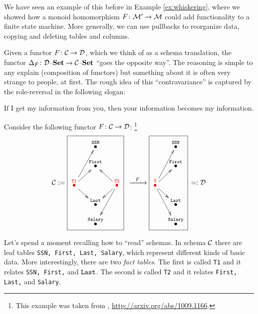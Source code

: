 \documentclass[CT4S-EN-RU]{subfiles}
\begin{document}
We have seen an example of this before in Example \ref{ex:whiskering}, where we showed how a monoid homomorphism $F\colon\mathcal{M}'\rightarrow\mathcal{M}$ could add functionality to a finite state machine. More generally, we can use pullbacks to reorganize data, copying and deleting tables and columns. 

\begin{remark}

Given a functor $F\colon\mathcal{C}\rightarrow\mathcal{D}$, which we think of as a schema translation, the functor $\Delta_F\colon\mathcal{D}{\text \textendash}{\bf Set}\rightarrow\mathcal{C}{\text \textendash}{\bf Set}$ “goes the opposite way”. The reasoning is simple to any explain (composition of functors) but something about it is often very strange to people, at first. The rough idea of this “contravariance” is captured by the role-reversal in the following slogan:

\begin{slogan} 
If I get my information from you, then your information becomes my information. 
\end{slogan}

\end{remark}

Consider the following functor $F\colon\mathcal{C}\rightarrow\mathcal{D}$: 
\footnote{This example was taken from \cite{Sp1}, \url{http://arxiv.org/abs/1009.1166}.}
\begin{align}\label{dia:translation}
\mcC:=\parbox{1.2in}{\fbox{\xymatrix@=10pt{&\LTO{SSN}\\&\LTO{First}\\\color{red}{\LTO{T1}}\ar[uur]\ar[ur]\ar[dr]&&\color{red}{\LTO{T2}}\ar[ul]\ar[dl]\ar[ddl]\\&\LTO{Last}\\&\LTO{Salary}}}}\Too{F}\parbox{.8in}{\fbox{\xymatrix@=10pt{&\LTO{SSN}\\&\LTO{First}\\\color{red}{\LTO{T}}\ar[uur]\ar[ur]\ar[dr]\ar[ddr]\\&\LTO{Last}\\&\LTO{Salary}}}}=:\mcD
\end{align}

Let's spend a moment recalling how to “read” schemas. In schema $\mathcal{C}$ there are leaf tables {\tt SSN, First, Last, Salary}, which represent different kinds of basic data. More interestingly, there are two {\em fact tables}. The first is called {\tt T1} and it relates {\tt SSN, First,} and ${\tt Last}$. The second is called {\tt T2} and it relates {\tt First, Last,} and {\tt Salary}.
\end{document}
